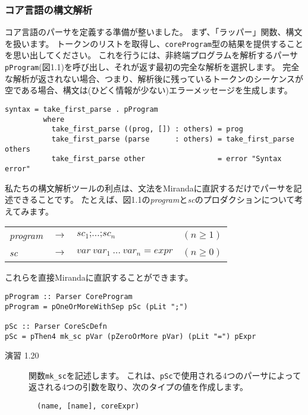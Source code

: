 \documentclass{jarticle}
\begin{document}
\subsubsection{コア言語の構文解析}

コア言語のパーサを定義する準備が整いました。
まず、「ラッパー」関数、構文を扱います。
トークンのリストを取得し、\texttt{coreProgram}型の結果を提供することを思い出してください。
これを行うには、非終端プログラムを解析するパーサ\texttt{pProgram}(図1.1)を呼び出し、それが返す最初の完全な解析を選択します。
完全な解析が返されない場合、つまり、解析後に残っているトークンのシーケンスが空である場合、構文は(ひどく情報が少ない)エラーメッセージを生成します。

\begin{verbatim}
syntax = take_first_parse . pProgram
         where
           take_first_parse ((prog, []) : others) = prog
           take_first_parse (parse      : others) = take_first_parse others
           take_first_parse other                 = error "Syntax error"
\end{verbatim}

私たちの構文解析ツールの利点は、文法をMirandaに直訳するだけでパーサを記述できることです。
たとえば、図1.1の\textit{program}と\textit{sc}のプロダクションについて考えてみます。

\begin{center}
	\begin{tabular} {l c l l}
		\textit{program} & $\rightarrow$ & $sc_1 \texttt{;} \ldots \texttt{;} sc_n$ & $(n \geq 1)$ \\
		\textit{sc}      & $\rightarrow$ & $var ~ var_1 ~ \ldots ~ var_n = expr$    & $(n \geq 0)$
	\end{tabular}
\end{center}

これらを直接Mirandaに直訳することができます。

\begin{verbatim}
pProgram :: Parser CoreProgram
pProgram = pOneOrMoreWithSep pSc (pLit ";")

pSc :: Parser CoreScDefn
pSc = pThen4 mk_sc pVar (pZeroOrMore pVar) (pLit "=") pExpr
\end{verbatim}

\begin{description}
	\item[演習 1.20] 関数\texttt{mk\_sc}を記述します。
		これは、\texttt{pSc}で使用される4つのパーサによって返される4つの引数を取り、次のタイプの値を作成します。
		\begin{verbatim}
  (name, [name], coreExpr)
\end{verbatim}
\end{description}
\end{document}
